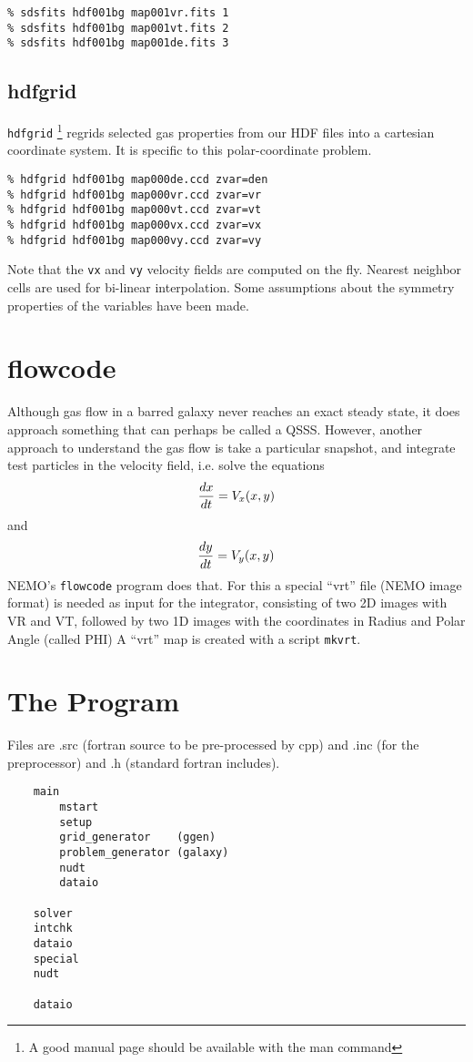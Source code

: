 \documentclass[11pt,epsf]{article}
\begin{document}
\footnotesize\begin{verbatim}
% sdsfits hdf001bg map001vr.fits 1
% sdsfits hdf001bg map001vt.fits 2
% sdsfits hdf001bg map001de.fits 3
\end{verbatim}\normalsize

\subsection{hdfgrid}

{\tt hdfgrid}
\footnote{A good manual page should be available with the man command}
regrids selected gas properties from our 
HDF files into a cartesian coordinate system. 
It is specific to this polar-coordinate problem.

\footnotesize\begin{verbatim}
% hdfgrid hdf001bg map000de.ccd zvar=den
% hdfgrid hdf001bg map000vr.ccd zvar=vr
% hdfgrid hdf001bg map000vt.ccd zvar=vt
% hdfgrid hdf001bg map000vx.ccd zvar=vx
% hdfgrid hdf001bg map000vy.ccd zvar=vy
\end{verbatim}\normalsize

Note that the {\tt vx} and {\tt vy} velocity fields
are computed on the fly. Nearest neighbor cells are
used for bi-linear interpolation. Some assumptions
about the symmetry properties of the variables
have been made.

\section{flowcode}

Although gas flow in a barred galaxy never reaches an
exact steady state, it does approach something
that can perhaps be called a QSSS. However, another approach
to understand the gas flow is take a particular snapshot, and
integrate test particles in the velocity field, i.e.
solve the equations
$$
	{dx \over dt } = V_x(x,y)
$$
and
$$
	{dy \over dt } = V_y(x,y)
$$
NEMO's {\tt flowcode} program does that. For this a special
``vrt'' file (NEMO image format) is needed as input for the
integrator, consisting
of two 2D images with VR and VT, followed by two 1D images
with the coordinates in Radius and Polar Angle (called PHI)
A ``vrt'' map is created with a script {\tt mkvrt}.

\section{The Program}

Files are .src (fortran source to be pre-processed by cpp) and 
.inc (for the preprocessor) and .h (standard fortran includes).

\begin{verbatim}
    main    
        mstart
	    setup
	    grid_generator    (ggen)
	    problem_generator (galaxy)
	    nudt
        dataio
	
	solver
	intchk
	dataio
	special
	nudt
	
	dataio
\end{verbatim}
\end{document}

